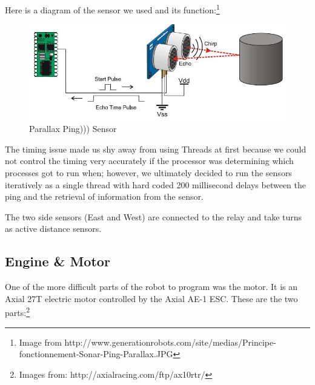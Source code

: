\documentclass[12pt]{article}
\begin{document}
Here is a diagram of the sensor we used and its function:\footnote{Image from http://www.generationrobots.com/site/medias/Principe-fonctionnement-Sonar-Ping-Parallax.JPG}

\begin{figure}[h]
\centerline{\includegraphics[scale=.8]{img/sonar}}
\caption{Parallax Ping))) Sensor}
\end{figure}

The timing issue made us shy away from using Threads at first because we could not control the timing very accurately if the processor was determining which processes got to run when; however, we ultimately decided to run the sensors iteratively as a single thread with hard coded 200 millisecond delays between the ping and the retrieval of information from the sensor.

The two side sensors (East and West) are connected to the relay and take turns as active distance sensors.

\clearpage
\subsection{Engine \& Motor}
One of the more difficult parts of the robot to program was the motor.  It is an Axial 27T electric motor controlled by the Axial AE-1 ESC.  These are the two parts:\footnote{Images from: http://axialracing.com/ftp/ax10rtr/}

\begin{figure}[h]
\centering
{}
\hspace{5mm}
\end{figure}
\end{document}
